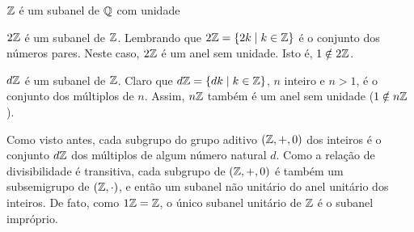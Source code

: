 \begin{exmp}
  $\mathbb{Z}$ é um subanel de $\mathbb{Q}$ com unidade
\end{exmp}
\begin{exmp}
  $2\mathbb{Z}$ é um subanel de $\mathbb{Z}$. Lembrando que $2\mathbb{Z} = \{2k \mid k \in \mathbb{Z}\}$ é o conjunto dos números pares. Neste caso, $2\mathbb{Z}$ é um anel sem unidade. Isto é, $1 \notin 2\mathbb{Z}$.
\end{exmp}
\begin{exmp}
  $d\mathbb{Z}$ é um subanel de $\mathbb{Z}$. Claro que $d\mathbb{Z} = \{dk \mid k \in \mathbb{Z}\}$, $n$ inteiro e $n>1$, é o conjunto dos múltiplos de $n$. Assim, $n\mathbb{Z}$ também é um anel sem unidade ($1 \notin n\mathbb{Z}$).
\end{exmp}
\begin{exmp}
  Como visto antes, cada subgrupo do grupo aditivo $(\mathbb{Z}, +, 0)$ dos inteiros é o conjunto $d\mathbb{Z}$ dos múltiplos de algum número natural $d$. Como a relação de divisibilidade é transitiva, cada subgrupo de $(\mathbb{Z}, +, 0)$ é também um subsemigrupo de $(\mathbb{Z}, \cdot)$, e então um subanel não unitário do anel unitário dos inteiros. De fato, como $1\mathbb{Z} = \mathbb{Z}$, o único subanel unitário de $\mathbb{Z}$ é o subanel impróprio.
\end{exmp}

